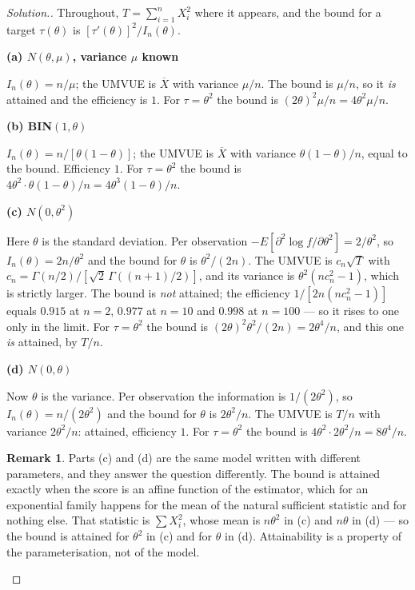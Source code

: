 \documentclass[12pt,a4paper]{report}
\theoremstyle{definition}
\newtheorem*{remark}{Remark}
\newcommand{\subhead}[1]{%
  \par\medskip\noindent\textbf{#1}\par\nobreak\smallskip}
\newenvironment{solution}
  {\renewcommand{\qedsymbol}{}\begin{proof}[\textit{Solution}.]}
  {\end{proof}}
\begin{document}
\begin{solution}
Throughout, $T=\sum_{i=1}^{n}X_i^{2}$ where it appears, and the bound for a
target $\tau(\theta)$ is $\left[\tau'(\theta)\right]^{2}/I_n(\theta)$.

\subhead{(a) $N(\theta,\mu)$, variance $\mu$ known}
$I_n(\theta)=n/\mu$; the UMVUE is $\overline{X}$ with variance $\mu/n$. The
bound is $\mu/n$, so it \emph{is} attained and the efficiency is $1$. For
$\tau=\theta^{2}$ the bound is $\left(2\theta\right)^{2}\mu/n = 4\theta^{2}\mu/n$.

\subhead{(b) BIN$(1,\theta)$}
$I_n(\theta)=n/\left[\theta(1-\theta)\right]$; the UMVUE is $\overline{X}$ with
variance $\theta(1-\theta)/n$, equal to the bound. Efficiency $1$. For
$\tau=\theta^{2}$ the bound is $4\theta^{2}\cdot\theta(1-\theta)/n
= 4\theta^{3}(1-\theta)/n$.

\subhead{(c) $N\left(0,\theta^{2}\right)$}
Here $\theta$ is the standard deviation. Per observation
$-E\left[\partial^{2}\log f/\partial\theta^{2}\right] = 2/\theta^{2}$, so
$I_n(\theta)=2n/\theta^{2}$ and the bound for $\theta$ is $\theta^{2}/(2n)$.
The UMVUE is $c_n\sqrt{T}$ with
$c_n = \Gamma(n/2)\big/\left[\sqrt2\,\Gamma\left((n+1)/2\right)\right]$, and its
variance is $\theta^{2}\left(nc_n^{2}-1\right)$, which is strictly larger. The
bound is \emph{not} attained; the efficiency
$1\big/\left[2n\left(nc_n^{2}-1\right)\right]$ equals $0.915$ at $n=2$, $0.977$
at $n=10$ and $0.998$ at $n=100$ --- so it rises to one only in the limit.
For $\tau=\theta^{2}$ the bound is $\left(2\theta\right)^{2}\theta^{2}/(2n)
= 2\theta^{4}/n$, and this one \emph{is} attained, by $T/n$.

\subhead{(d) $N(0,\theta)$}
Now $\theta$ is the variance. Per observation the information is
$1/\left(2\theta^{2}\right)$, so $I_n(\theta)=n/\left(2\theta^{2}\right)$ and the
bound for $\theta$ is $2\theta^{2}/n$. The UMVUE is $T/n$ with variance
$2\theta^{2}/n$: attained, efficiency $1$. For $\tau=\theta^{2}$ the bound is
$4\theta^{2}\cdot 2\theta^{2}/n = 8\theta^{4}/n$.

\begin{remark}
Parts (c) and (d) are the same model written with different parameters, and they
answer the question differently. The bound is attained exactly when the score is
an affine function of the estimator, which for an exponential family happens for
the mean of the natural sufficient statistic and for nothing else. That
statistic is $\sum X_i^{2}$, whose mean is $n\theta^{2}$ in (c) and $n\theta$ in
(d) --- so the bound is attained for $\theta^{2}$ in (c) and for $\theta$ in
(d). Attainability is a property of the parameterisation, not of the model.
\end{remark}
\end{solution}
\end{document}
